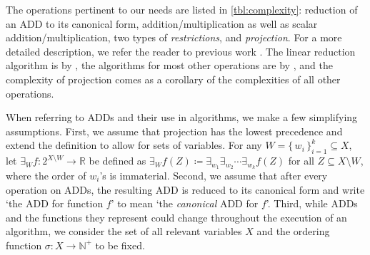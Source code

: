 The operations pertinent to our needs are listed in \cref{tbl:complexity}: reduction of an ADD to its canonical form, addition/multiplication as well as scalar addition/multiplication, two types of \emph{restrictions}, and \emph{projection}. For a more detailed description, we refer the reader to previous work \citep{DBLP:journals/fmsd/BaharFGHMPS97,DBLP:conf/aaai/DudekPV20}. The linear reduction algorithm is by \citet{somenzi1998cudd}, the algorithms for most other operations are by \citet{DBLP:journals/tc/Bryant86}, and the complexity of projection comes as a corollary of the complexities of all other operations.

When referring to ADDs and their use in algorithms, we make a few simplifying assumptions. First, we assume that projection has the lowest precedence and extend the definition to allow for sets of variables. For any $W = \{\,w_i\,\}_{i=1}^k \subseteq X$, let $\exists_W f\colon 2^{X \setminus W} \to \mathbb{R}$ be defined as $\exists_Wf(Z) \coloneqq \exists_{w_1}\exists_{w_2}\cdots\exists_{w_k}f(Z)$ for all $Z \subseteq X \setminus W$, where the order of $w_i$'s is immaterial. Second, we assume that after every operation on ADDs, the resulting ADD is reduced to its canonical form and write `the ADD for function $f$' to mean `the \emph{canonical} ADD for $f$'. Third, while ADDs and the functions they represent could change throughout the execution of an algorithm, we consider the set of all relevant variables $X$ and the ordering function $\sigma\colon X \to \mathbb{N}^+$ to be fixed.




